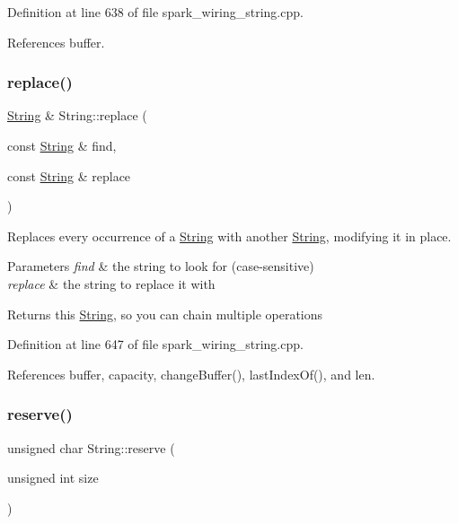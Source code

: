 Definition at line 638 of file spark\+\_\+wiring\+\_\+string.\+cpp.



References buffer.

\mbox{\label{class_string_ad87b4e7c4d06d6fee95c5caa21b6ca83}} 
\subsubsection{\texorpdfstring{replace()}{replace()}\hspace{0.1cm}{\footnotesize\ttfamily [2/2]}}
{\footnotesize\ttfamily \hyperlink{class_string}{String} \& String\+::replace (\begin{DoxyParamCaption}\item[{const \hyperlink{class_string}{String} \&}]{find,  }\item[{const \hyperlink{class_string}{String} \&}]{replace }\end{DoxyParamCaption})}



Replaces every occurrence of a \hyperlink{class_string}{String} with another \hyperlink{class_string}{String}, modifying it in place. 


\begin{DoxyParams}{Parameters}
{\em find} & the string to look for (case-\/sensitive)\\
\hline
{\em replace} & the string to replace it with\\
\hline
\end{DoxyParams}
\begin{DoxyReturn}{Returns}
this \hyperlink{class_string}{String}, so you can chain multiple operations 
\end{DoxyReturn}


Definition at line 647 of file spark\+\_\+wiring\+\_\+string.\+cpp.



References buffer, capacity, change\+Buffer(), last\+Index\+Of(), and len.

\mbox{\label{class_string_a138edcc762cb87649d81757d1e4ab419}} 
\subsubsection{\texorpdfstring{reserve()}{reserve()}}
{\footnotesize\ttfamily unsigned char String\+::reserve (\begin{DoxyParamCaption}\item[{unsigned int}]{size }\end{DoxyParamCaption})}



